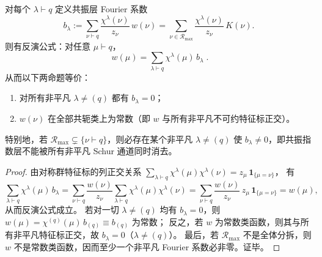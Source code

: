 \begin{proposition}\label{prop:pom-schur-resonant-layer-total-cancellation}
对每个 \(\lambda\vdash q\) 定义共振层 Fourier 系数
\[
b_\lambda:=\sum_{\nu\vdash q}\frac{\chi^\lambda(\nu)}{z_\nu}\,w(\nu)
=\sum_{\nu\in\mathcal{R}_{\max}}\frac{\chi^\lambda(\nu)}{z_\nu}\,K(\nu).
\]
则有反演公式：对任意 \(\mu\vdash q\)，
\[
\boxed{\;
w(\mu)=\sum_{\lambda\vdash q}\chi^\lambda(\mu)\,b_\lambda\; }.
\]
从而以下两命题等价：
\begin{enumerate}
  \item 对所有非平凡 \(\lambda\neq(q)\) 都有 \(b_\lambda=0\)；
  \item \(w(\nu)\) 在全部共轭类上为常数（即 \(w\) 与所有非平凡不可约特征标正交）。
\end{enumerate}
特别地，若 \(\mathcal{R}_{\max}\subsetneq\{\nu\vdash q\}\)，则必存在某个非平凡 \(\lambda\neq(q)\) 使 \(b_\lambda\neq 0\)，即共振指数层不能被所有非平凡 Schur 通道同时消去。
\end{proposition}
\begin{proof}
由对称群特征标的列正交关系
\(
\sum_{\lambda\vdash q}\chi^\lambda(\mu)\chi^\lambda(\nu)=z_\mu\,\mathbf 1_{\{\mu=\nu\}}
\)，
有
\[
\sum_{\lambda\vdash q}\chi^\lambda(\mu)\,b_\lambda
=\sum_{\nu\vdash q}\frac{w(\nu)}{z_\nu}\sum_{\lambda\vdash q}\chi^\lambda(\mu)\chi^\lambda(\nu)
=\sum_{\nu\vdash q}\frac{w(\nu)}{z_\nu}\,z_\mu\,\mathbf 1_{\{\mu=\nu\}}
=w(\mu),
\]
从而反演公式成立。
若对一切 \(\lambda\neq(q)\) 均有 \(b_\lambda=0\)，则 \(w(\mu)=\chi^{(q)}(\mu)\,b_{(q)}\equiv b_{(q)}\) 为常数；
反之，若 \(w\) 为常数类函数，则其与所有非平凡特征标正交，故 \(b_\lambda=0\)（\(\lambda\neq(q)\)）。
最后，若 \(\mathcal{R}_{\max}\) 不是全体分拆，则 \(w\) 不是常数类函数，因而至少一个非平凡 Fourier 系数必非零。证毕。
\end{proof}

